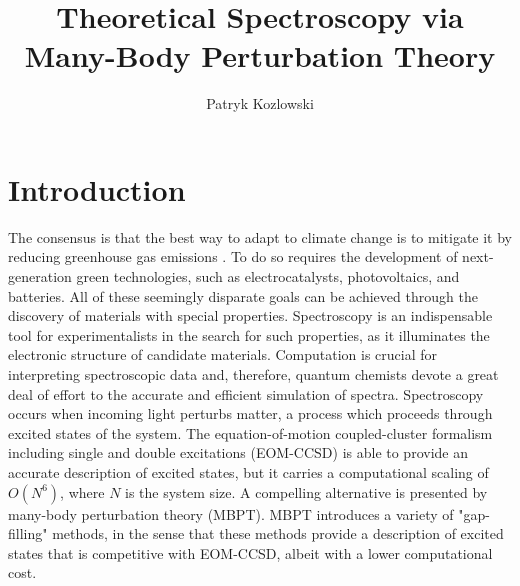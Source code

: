 \documentclass[letterpaper]{article}
\author[1]{Patryk Kozlowski}
\affil[1]{Department of Chemistry and Chemical Biology, Harvard University, Cambridge, MA 02138, USA}
\title{Theoretical Spectroscopy via Many-Body Perturbation Theory}
\begin{document}
\maketitle


\section{Introduction}
The consensus is that the best way to adapt to climate change is to mitigate it by reducing greenhouse gas emissions \cite{OECD2022-vn}. To do so requires the development of next-generation green technologies, such as electrocatalysts\cite{Seh2017-jx}, photovoltaics\cite{Du2023-kd}, and batteries\cite{Titirici2024-ao}. All of these seemingly disparate goals can be achieved through the discovery of materials with special properties. Spectroscopy is an indispensable tool for experimentalists in the search for such properties, as it illuminates the electronic structure of candidate materials. Computation is crucial for interpreting spectroscopic data and, therefore, quantum chemists devote a great deal of effort to the accurate and efficient simulation of spectra\cite{Neese2025-lp}. Spectroscopy occurs when incoming light perturbs matter, a process which proceeds through excited states of the system. The equation-of-motion coupled-cluster formalism including single and double excitations (EOM-CCSD) is able to provide an accurate description of excited states\cite{Krylov2008-sg}, but it carries a computational scaling of $O(N^6)$, where $N$ is the system size. A compelling alternative is presented by many-body perturbation theory (MBPT). MBPT introduces a variety of "gap-filling" methods, in the sense that these methods provide a description of excited states that is competitive with EOM-CCSD\cite{Golze2019-wm}, albeit with a lower computational cost. 
\end{document}
